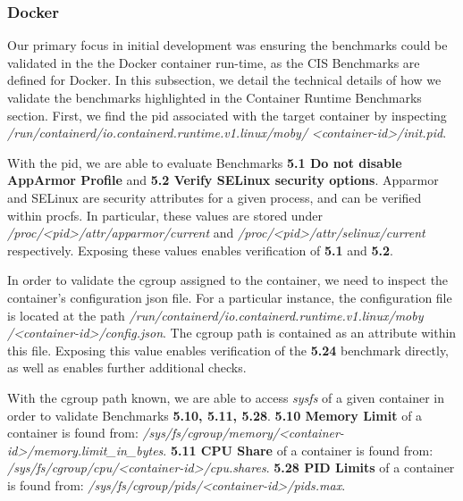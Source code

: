 \subsubsection*{Docker}

Our primary focus in initial development was ensuring the benchmarks could be validated in the the Docker container run-time, as the CIS Benchmarks are defined for Docker. In this subsection, we detail the technical details of how we validate the benchmarks highlighted in the Container Runtime Benchmarks section. First, we find the pid associated with the target container by inspecting \textit{/run/containerd/io.containerd.runtime.v1.linux/moby/}
\textit{<container-id>/init.pid}.

With the pid, we are able to evaluate Benchmarks \textbf{5.1 Do not disable AppArmor Profile} and \textbf{5.2 Verify SELinux security options}. Apparmor and SELinux are security attributes for a given process, and can be verified within procfs. In particular, these values are stored under \textit{/proc/<pid>/attr/apparmor/current} and \textit{/proc/<pid>/attr/selinux/current} respectively. Exposing these values enables verification of \textbf{5.1} and \textbf{5.2}.

In order to validate the cgroup assigned to the container, we need to inspect the container's configuration json file. For a particular instance, the configuration file is located at the path \textit{/run/containerd/io.containerd.runtime.v1.linux/moby} \textit{/<container-id>/config.json}. The cgroup path is contained as an attribute within this file. Exposing this value enables verification of the \textbf{5.24} benchmark directly, as well as enables further additional checks.

With the cgroup path known, we are able to access \textit{sysfs} of a given container in order to validate Benchmarks \textbf{5.10, 5.11, 5.28}. \textbf{5.10 Memory Limit} of a container is found from: \textit{/sys/fs/cgroup/memory/<container-id>/memory.limit\_in\_bytes}.
\textbf{5.11 CPU Share} of a container is found from: \textit{/sys/fs/cgroup/cpu/<container-id>/cpu.shares}.
\textbf{5.28 PID Limits} of a container is found from: \textit{/sys/fs/cgroup/pids/<container-id>/pids.max}.
 